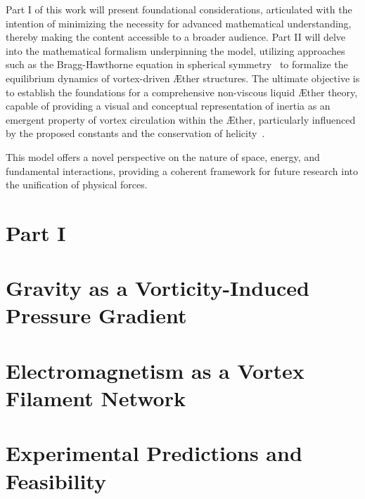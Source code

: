 \documentclass[a4paper,10pt]{article}
\begin{document}
    Part I of this work will present foundational considerations, articulated with the intention of minimizing the necessity for advanced mathematical understanding, thereby making the content accessible to a broader audience. Part II will delve into the mathematical formalism underpinning the model, utilizing approaches such as the Bragg-Hawthorne equation in spherical symmetry~\cite{keller2024} to formalize the equilibrium dynamics of vortex-driven \AE ther structures. The ultimate objective is to establish the foundations for a comprehensive non-viscous liquid \AE ther theory, capable of providing a visual and conceptual representation of inertia as an emergent property of vortex circulation within the \AE ther, particularly influenced by the proposed constants and the conservation of helicity~\cite{kleckner2016}.





    This model offers a novel perspective on the nature of space, energy, and fundamental interactions, providing a coherent framework for future research into the unification of physical forces.





    \section{Part I}\label{sec:part-1}
    

    \section{Gravity as a Vorticity-Induced Pressure Gradient}\label{sec:gravity-as-a-vorticity-induced-pressure-gradient}
    \section{Electromagnetism as a Vortex Filament Network}\label{sec:electromagnetism-as-a-vortex-filament-network}
    \section{Experimental Predictions and Feasibility}\label{sec:experimental-predictions-and-feasibility}
\end{document}
